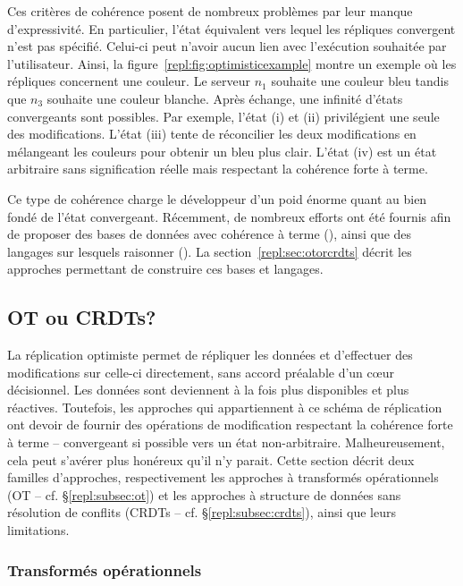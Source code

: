 Ces critères de cohérence posent de nombreux problèmes par leur manque
d'expressivité. En particulier, l'état équivalent vers lequel les répliques
convergent n'est pas spécifié. Celui-ci peut n'avoir aucun lien avec l'exécution
souhaitée par l'utilisateur. Ainsi, la figure~\ref{repl:fig:optimisticexample}
montre un exemple où les répliques concernent une couleur. Le serveur $n_1$
souhaite une couleur bleu tandis que $n_3$ souhaite une couleur blanche. Après
échange, une infinité d'états convergeants sont possibles. Par exemple, l'état
(i) et (ii) privilégient une seule des modifications. L'état (iii) tente de
réconcilier les deux modifications en mélangeant les couleurs pour obtenir un
bleu plus clair. L'état (iv) est un état arbitraire sans signification réelle
mais respectant la cohérence forte à terme.

Ce type de cohérence charge le développeur d'un poid énorme quant au bien fondé
de l'état convergeant.  Récemment, de nombreux efforts ont été fournis afin de
proposer des bases de données avec cohérence à terme (\REF), ainsi que des
langages sur lesquels raisonner (\REF). La section~\ref{repl:sec:otorcrdts}
décrit les approches permettant de construire ces bases et langages.


\subsection{OT ou CRDTs?}
\label{repl:subsec:otorcrdts}

La réplication optimiste permet de répliquer les données et d'effectuer des
modifications sur celle-ci directement, sans accord préalable d'un cœur
décisionnel. Les données sont deviennent à la fois plus disponibles et plus
réactives. Toutefois, les approches qui appartiennent à ce schéma de réplication
ont devoir de fournir des opérations de modification respectant la cohérence
forte à terme -- convergeant si possible vers un état
non-arbitraire. Malheureusement, cela peut s'avérer plus honéreux qu'il n'y
parait. Cette section décrit deux familles d'approches, respectivement les
approches à transformés opérationnels (OT -- cf. §\ref{repl:subsec:ot}) et les
approches à structure de données sans résolution de conflits (CRDTs --
cf. §\ref{repl:subsec:crdts}), ainsi que leurs limitations.

\subsubsection{Transformés opérationnels}
\label{repl:subsubsec:ot}

